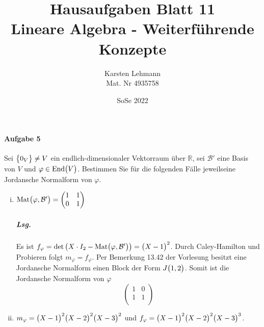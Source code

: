 \documentclass{scrreprt}
\author{Karsten Lehmann\\Mat. Nr 4935758}
\date{SoSe 2022}
\title{Hausaufgaben Blatt 11\\Lineare Algebra - Weiterführende Konzepte}
\newcommand{\End}{\text{End}}
\newcommand{\Mat}{\text{Mat}}
\begin{document}
\paragraph{Aufgabe 5} Sei $\qty\big{0_V} \ne V$ ein endlich-dimensionaler
Vektorraum über $\mathbb{R}$, sei $\mathcal{B}'$ eine Basis von $V$ und
$\varphi \in \End\qty\big(V)$.
Bestimmen Sie für die folgenden Fälle jeweilseine Jordansche Normalform von
$\varphi$.
\begin{enumerate}[(i)]
\item $\Mat\qty\big(\varphi, \mathcal{B}') = \begin{pmatrix}
    1 & 1 \\
    0 & 1 \\
  \end{pmatrix}$

  \subparagraph{Lsg.} Es ist $f_{\varphi} = \det\qty\big(
    X \cdot I_2 - \Mat\qty\big(\varphi, \mathcal{B}')
  ) = \qty\big(X - 1)^2$.
  Durch Caley-Hamilton und Probieren folgt $m_{\varphi} = f_{\varphi}$.
  Per Bemerkung 13.42 der Vorlesung besitzt eine Jordansche Normalform einen
  Block der Form $J\qty\big(1, 2)$.
  Somit ist die Jordansche Normalform von $\varphi$
  \[
    \begin{pmatrix}
      1 & 0 \\
      1 & 1 \\
    \end{pmatrix}
  \]

\item $m_{\varphi} = \qty\big(X - 1)^2 \qty\big(X - 2)^2\qty\big(X - 3)^2$ und
  $f_{\varphi} = \qty\big(X - 1)^2 \qty\big(X - 2)^2\qty\big(X - 3)^3$.


\end{enumerate}
\end{document}
